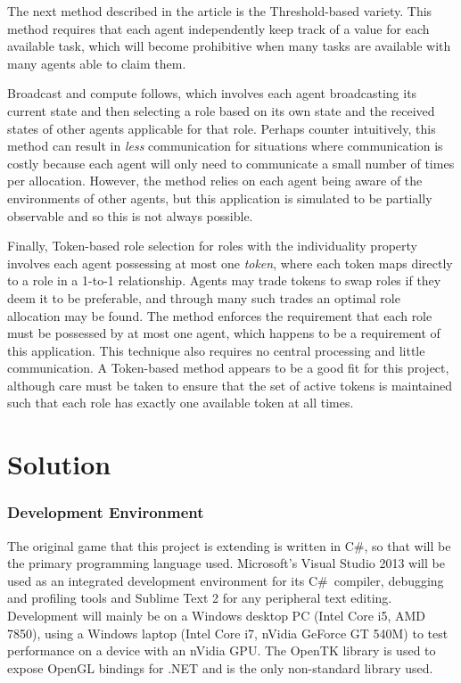 \documentclass[12pt,a4paper]{article}
\newcommand{\Csh}{C{\lserif\#}}
\begin{document}
The next method described in the article is the Threshold-based variety. This method requires that each agent independently keep track of a value for each available task, which will become prohibitive when many tasks are available with many agents able to claim them.

Broadcast and compute follows, which involves each agent broadcasting its current state and then selecting a role based on its own state and the received states of other agents applicable for that role. Perhaps counter intuitively, this method can result in \emph{less} communication for situations where communication is costly because each agent will only need to communicate a small number of times per allocation. However, the method relies on each agent being aware of the environments of other agents, but this application is simulated to be partially observable and so this is not always possible.

Finally, Token-based role selection for roles with the individuality property involves each agent possessing at most one \emph{token}, where each token maps directly to a role in a 1-to-1 relationship. Agents may trade tokens to swap roles if they deem it to be preferable, and through many such trades an optimal role allocation may be found. The method enforces the requirement that each role must be possessed by at most one agent, which happens to be a requirement of this application. This technique also requires no central processing and little communication. A Token-based method appears to be a good fit for this project, although care must be taken to ensure that the set of active tokens is maintained such that each role has exactly one available token at all times.

\section{Solution}
\subsubsection{Development Environment}\noindent
The original game that this project is extending is written in \Csh, so that will be the primary programming language used. Microsoft's Visual Studio 2013 will be used as an integrated development environment for its \Csh~compiler, debugging and profiling tools and Sublime Text 2 for any peripheral text editing. Development will mainly be on a Windows desktop PC (Intel Core i5, AMD 7850), using a Windows laptop (Intel Core i7, nVidia GeForce GT 540M) to test performance on a device with an nVidia GPU. The OpenTK library is used to expose OpenGL bindings for .NET and is the only non-standard library used.
\end{document}
